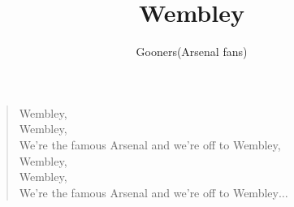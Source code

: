 \documentclass[a4paper,12pt]{article}
\title{Wembley}
\author{Gooners(Arsenal fans)}
\date{}
\begin{document}
	
	\maketitle
	
	\begin{verse}
		
		Wembley, \\
		Wembley, \\
		We're the famous Arsenal and we're off to Wembley, \\
		Wembley, \\
		Wembley, \\
		We're the famous Arsenal and we're off to Wembley$\ldots$
		
	\end{verse}
	
\end{document}
